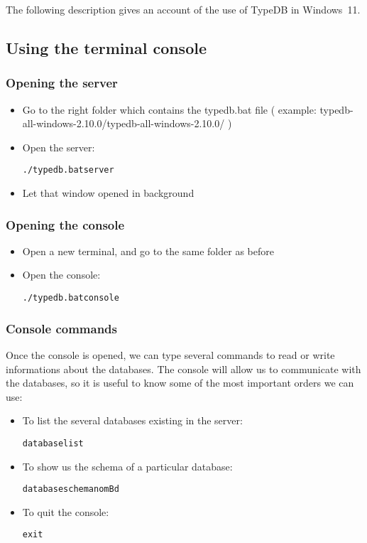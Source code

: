 \documentclass{article}
\begin{document}
The following description gives an account of the use of TypeDB in Windows~11.

\subsection{Using the terminal console}


\subsubsection{Opening the server}

\begin{itemize}
\item Go to the right folder which contains the typedb.bat file ( example: typedb-all-windows-2.10.0/typedb-all-windows-2.10.0/ )
\item Open the server: \begin{alltt}./typedb.bat server \end{alltt}
\item Let that window opened in background
\end{itemize}

\subsubsection{Opening the console}
\begin{itemize}
\item Open a new terminal, and go to the same folder as before
\item Open the console:   \begin{alltt}./typedb.bat console\end{alltt}     
\end{itemize}

\subsubsection{Console commands}

Once the console is opened, we can type several commands to read or write informations about the databases. The console will allow us to communicate with the databases, so it is useful to know some of the most important orders we can use:

\begin{itemize}
\item To list the several databases existing in the server:    \begin{alltt}database list\end{alltt}       
\item To show us the schema of a particular database:    \begin{alltt}database schema nomBd\end{alltt}       
\item To quit the console:                        \begin{alltt}exit\end{alltt}  
\end{itemize}
\end{document}
